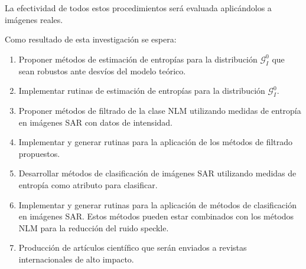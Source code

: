 \documentclass[11pt]{article}
\begin{document}
La efectividad de todos estos procedimientos será evaluada aplicándolos a imágenes reales.

Como resultado de esta investigación se espera:
\begin{enumerate}
	\item Proponer métodos de estimación de entropías para la distribución $\mathcal{G}_I^0$ que sean robustos ante desvíos del modelo teórico.
	\item Implementar rutinas de estimación de entropías para la distribución $\mathcal{G}_I^0$.
	\item Proponer métodos de filtrado de la clase NLM utilizando medidas de entropía en imágenes SAR con datos de intensidad.
	\item Implementar y generar rutinas para la aplicación de los métodos de filtrado propuestos.
	\item Desarrollar métodos de clasificación de imágenes SAR utilizando medidas de entropía como atributo para clasificar.
	\item Implementar y generar rutinas para la aplicación de métodos de clasificación en imágenes SAR. Estos métodos pueden estar combinados con los métodos NLM para la reducción del ruido speckle.
	\item Producción de artículos científico que serán enviados a revistas internacionales de alto impacto. 
\end{enumerate}

%


\end{document}
